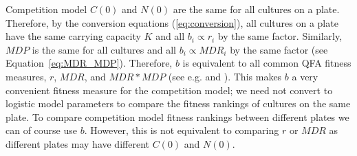 Competition model \(C(0)\) and \(N(0)\) are the same for all
cultures on a plate. Therefore, by the conversion equations
(\ref{eq:conversion}), all cultures on a plate have the same carrying
capacity \(K\) and all \(b_{i} \propto r_{i}\) by the same
factor. Similarly, \(MDP\) is the same for all cultures and all
\(b_{i} \propto MDR_{i}\) by the same factor (see
Equation~\ref{eq:MDR_MDP}). Therefore, \(b\) is equivalent to all
common QFA fitness measures, \(r\), \(MDR\), and \(MDR*MDP\) (see
e.g. \citet{Addinall2011} and \citet{qfa2016}). This makes \(b\) a
very convenient fitness measure for the competition model; we need not
convert to logistic model parameters to compare the fitness rankings
of cultures on the same plate. To compare competition model fitness
rankings between different plates we can of course use \(b\). However,
this is not equivalent to comparing \(r\) or \(MDR\) as different
plates may have different \(C(0)\) and \(N(0)\).

